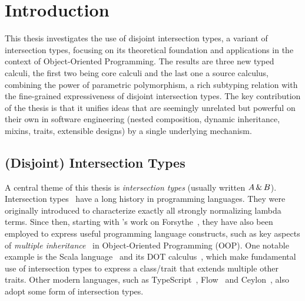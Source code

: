
\chapter{Introduction}




This thesis investigates the use of disjoint intersection types, a variant of
intersection types, focusing on its theoretical foundation and applications in
the context of Object-Oriented Programming. The results are three new typed
calculi, the first two being core calculi and the last one a source calculus,
combining the power of parametric polymorphism, a rich subtyping relation with
the fine-grained expressiveness of disjoint intersection types. The key
contribution of the thesis is that it unifies ideas that are seemingly unrelated
but powerful on their own in software engineering (nested composition, dynamic
inheritance, mixins, traits, extensible designs) by a single underlying
mechanism.


\section{(Disjoint) Intersection Types}


A central theme of this thesis is \textit{intersection types} (usually written $A \,\&\, B$). Intersection
types~\citep{pottinger1980type, coppoInter} have a long history in
programming languages. They were originally introduced to characterize exactly
all strongly normalizing lambda terms. Since then, starting with
\citeauthor{reynolds1988preliminary}'s work on
Forsythe~\citep{reynolds1988preliminary}, they have also been employed to
express useful programming language constructs, such as key aspects of
\emph{multiple inheritance}~\citep{compagnoni1996higher} in Object-Oriented
Programming (OOP). One notable example is the Scala
language~\citep{odersky2004overview} and its DOT
calculus~\citep{amin2012dependent}, which make fundamental use of intersection
types to express a class/trait that extends multiple other traits. Other modern
languages, such as TypeScript~\citep{typescript}, Flow~\citep{flow} and
Ceylon~\citep{ceylon}, also adopt some form of intersection types.

